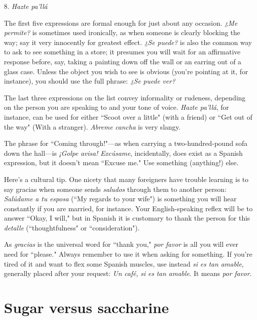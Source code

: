 8. \emph{Hazte pa'llá}

\bsk

The first five expressions are formal enough for just about any occasion. \emph{¿Me permite?} is sometimes used ironically, as when someone is
clearly blocking the way; say it very innocently for greatest effect. \emph{¿Se
puede?} is also the common way to ask to see something in a store; it
presumes you will wait for an affirmative response before, say, taking a
painting down off the wall or an earring out of a glass case. Unless the
object you wish to see is obvious (you're pointing at it, for instance),
you should use the full phrase: \emph{¿Se puede ver?}

The last three expressions on the list convey informality or
rudeness, depending on the person you are speaking to and your
tone of voice. \emph{Hazte pa'llá}, for instance, can be used for either ``Scoot
over a little" (with a friend) or ``Get out of the way" (With a stranger).
\emph{Abreme cancha} is very slangy.

The phrase for ``Coming through!"---as when carrying a two-hundred-pound sofa down the hall---is \emph{¡Golpe avisa! Excúsame}, incidentally, does exist as a Spanish expression, but it doesn't mean ``Excuse me." Use something (anything!) else.

Here's a cultural tip. One nicety that many foreigners
have trouble learning is to say gracias when someone sends \emph{saludos}
through them to another person: \emph{Salúdame a tu esposa} (``My regards to your wife") is something you will hear constantly if you are
married, for instance. Your English-speaking reflex will be to answer
``Okay, I will," but in Spanish it is customary to thank the person for
this \emph{detalle} (``thoughtfulness" or ``consideration").

As \emph{gracias} is the universal word for ``thank you," \emph{por favor} is
all you will ever need for ``please." Always remember to use it when
asking for something. If you're tired of it and want to flex some Spanish muscles, use instead \emph{si es tan amable}, generally placed after your
request: \emph{Un café, si es tan amable}. It means \emph{por favor}.

\section{Sugar versus saccharine}

